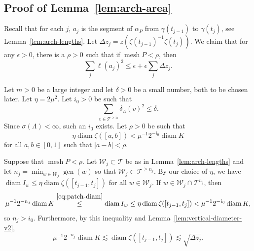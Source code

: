 \documentclass[12pt,reqno]{amsart}
\newcommand{\cT}{\mathcal{T}}
\newcommand{\cW}{\mathcal{W}}
\DeclareMathOperator{\mesh}{mesh}
\DeclareMathOperator{\gen}{gen}
\theoremstyle{remark}
\newcommand{\0}{\mathbf{0}}
\renewcommand{\1}{\mathbf 1}
\DeclareMathOperator{\diam}{diam}
\begin{document}
\subsection{Proof of Lemma~\ref{lem:arch-area}}
Recall that for each $j$, $a_j$ is the segment of $\alpha_P$ from $\gamma(t_{j-1})$ to $\gamma(t_j)$, see Lemma~\ref{lem:arch-lengths}. Let $\Delta z_j = z(\zeta(t_{j-1})^{-1} \zeta(t_j))$. We claim that for any $\epsilon>0$, there is a $\rho>0$ such that if $\mesh P<\rho$, then
  $$
  \sum_j \ell(a_j)^2 \le \epsilon + \epsilon \sum_j \Delta z_j.
  $$

  Let $m>0$ be a large integer and let $\delta > 0$ be a small number, both to be chosen later. Let $\eta = 2 \mu^2$. Let $i_0>0$ be such that
  $$\sum_{v\in \cT^{> i_0}}\delta_\Lambda(v)^2 \le \delta.$$
  Since $\sigma(\Lambda)<\infty$, such an $i_0$ exists.
  Let $\rho>0$ be such that
  $$\eta \diam \zeta([a,b]) < \mu^{-1} 2^{-i_0} \diam K$$
  for all $a,b\in [0,1]$ such that $|a-b|<\rho$.

  Suppose that $\mesh P < \rho$.
  Let $\cW_j\subset \cT$ be as in Lemma~\ref{lem:arch-lengths} and let $n_j = \min_{w\in \cW_j} \gen(w)$ so that $\cW_j \subset \cT^{\ge n_j}$. By our choice of $\eta$, we have $\diam I_w \le \eta \diam \zeta([t_{j-1},t_j])$ for all $w\in \cW_j$. If $w\in \cW_j\cap \cT^{n_j}$, then 
  $$\mu^{-1}2^{-n_j} \diam K \stackrel{\eqref{eq:patch-diam}}{\le} \diam I_w \le \eta \diam \zeta([t_{j-1},t_j]) < \mu^{-1} 2^{-i_0}\diam K,$$
  so $n_j > i_0$. Furthermore, by this inequality and Lemma~\ref{lem:vertical-diameter-v2},
  \begin{equation}\label{eq:nj-size-bound}
    \mu^{-1}2^{-n_j} \diam K \lesssim \diam \zeta([t_{j-1},t_j]) \lesssim \sqrt{\Delta z_j}.
  \end{equation}
  
\end{document}
